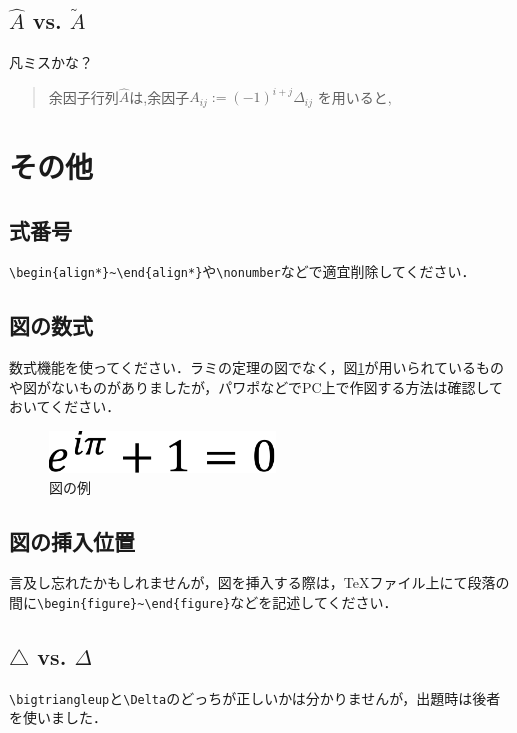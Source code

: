 \documentclass[11pt,a4paper]{jsarticle}
\begin{document}
\subsection{$\hat{A}$ vs. $\tilde{A}$}

凡ミスかな？

\begin{quotation}
  余因子行列$\hat{A}$は,\quad 余因子$A_{ij}:=(-1)^{i+j}\Delta_{ij}$ を用いると,
\end{quotation}

\section{その他}

\subsection{式番号}

\verb|\begin{align*}~\end{align*}|や\verb|\nonumber|などで適宜削除してください．

\subsection{図の数式}

数式機能を使ってください．ラミの定理の図でなく，図\ref{fig:example-image}が用いられているものや図がないものがありましたが，パワポなどでPC上で作図する方法は確認しておいてください．

\begin{figure}[hbtp]
  \centering %
  \includegraphics[width=6cm]{example-crop.pdf} %
  \caption{図の例} %
  \label{fig:example-image} %
\end{figure}

\subsection{図の挿入位置}

言及し忘れたかもしれませんが，図を挿入する際は，TeXファイル上にて段落の間に\verb|\begin{figure}~\end{figure}|などを記述してください．

\subsection{$\bigtriangleup$ vs. $\Delta$}

\verb|\bigtriangleup|と\verb|\Delta|のどっちが正しいかは分かりませんが，出題時は後者を使いました．
\end{document}
